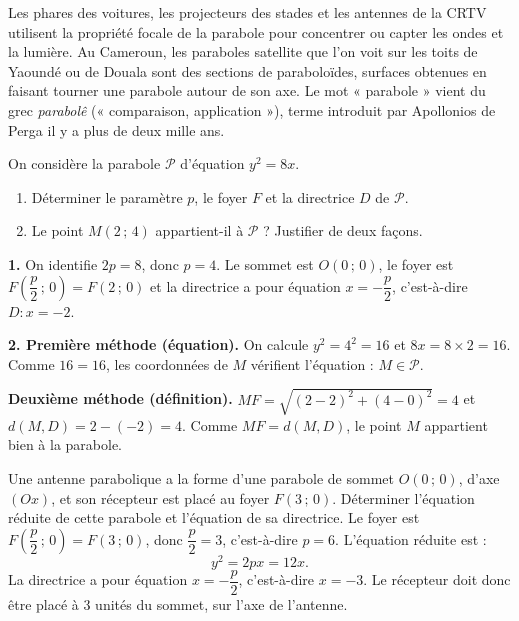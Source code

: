 \documentclass[11pt]{article}
\newcounter{popsec}
\newcounter{popsub}
\newcommand{\courssub}[1]{%
  \stepcounter{popsub}%
  \par\vspace{9pt}\noindent{\popxbold\fontsize{11.5}{13}\selectfont\color{popink}{\color{poporange}\thepopsec.\thepopsub}\hspace{6pt}#1}\par\nopagebreak\vspace{4pt}
}
\begin{document}
\begin{savaistu}
Les phares des voitures, les projecteurs des stades et les antennes de la CRTV utilisent la propriété focale de la parabole pour concentrer ou capter les ondes et la lumière. Au Cameroun, les paraboles satellite que l'on voit sur les toits de Yaoundé ou de Douala sont des sections de paraboloïdes, surfaces obtenues en faisant tourner une parabole autour de son axe. Le mot « parabole » vient du grec \emph{parabolê} (« comparaison, application »), terme introduit par Apollonios de Perga il y a plus de deux mille ans.
\end{savaistu}

\courssub{Exercices résolus}

\begin{exoresolu}
On considère la parabole $\mathcal{P}$ d'équation $y^2 = 8x$.
\begin{enumerate}
\item Déterminer le paramètre $p$, le foyer $F$ et la directrice $D$ de $\mathcal{P}$.
\item Le point $M(2\,;\,4)$ appartient-il à $\mathcal{P}$ ? Justifier de deux façons.
\end{enumerate}
\tcblower
\textbf{1.} On identifie $2p = 8$, donc $p = 4$. Le sommet est $O(0\,;\,0)$, le foyer est $F\left(\dfrac{p}{2}\,;\,0\right) = F(2\,;\,0)$ et la directrice a pour équation $x = -\dfrac{p}{2}$, c'est-à-dire $D : x = -2$.

\textbf{2. Première méthode (équation).} On calcule $y^2 = 4^2 = 16$ et $8x = 8 \times 2 = 16$. Comme $16 = 16$, les coordonnées de $M$ vérifient l'équation : $M \in \mathcal{P}$.

\textbf{Deuxième méthode (définition).} $MF = \sqrt{(2-2)^2 + (4-0)^2} = 4$ et $d(M,D) = 2 - (-2) = 4$. Comme $MF = d(M,D)$, le point $M$ appartient bien à la parabole.
\end{exoresolu}

\begin{exoresolu}
Une antenne parabolique a la forme d'une parabole de sommet $O(0\,;\,0)$, d'axe $(Ox)$, et son récepteur est placé au foyer $F(3\,;\,0)$. Déterminer l'équation réduite de cette parabole et l'équation de sa directrice.
\tcblower
Le foyer est $F\left(\dfrac{p}{2}\,;\,0\right) = F(3\,;\,0)$, donc $\dfrac{p}{2} = 3$, c'est-à-dire $p = 6$. L'équation réduite est :
\[ y^2 = 2px = 12x. \]
La directrice a pour équation $x = -\dfrac{p}{2}$, c'est-à-dire $x = -3$. Le récepteur doit donc être placé à 3 unités du sommet, sur l'axe de l'antenne.
\end{exoresolu}
\end{document}
